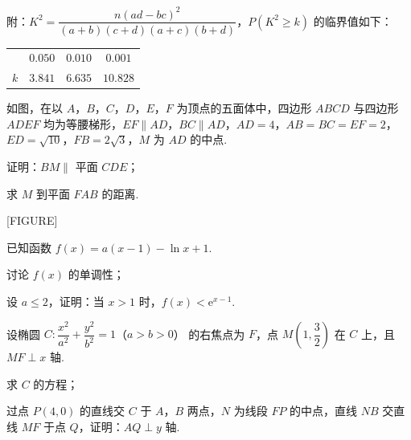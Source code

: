 \documentclass[UTF8,12pt]{ctexart}
\begin{document}
\begin{questions}[start=17]
    附：$K^2=\dfrac{n(ad-bc)^2}{(a+b)(c+d)(a+c)(b+d)}$，$P(K^2\ge k)$ 的临界值如下：

    \begin{center}
      \begin{tabular}{lccc}
        \toprule
            & $0.050$ & $0.010$ & $0.001$ \\
        $k$ & $3.841$ & $6.635$ & $10.828$ \\
        \bottomrule
      \end{tabular}
    \end{center}

  \item 如图，在以 $A$，$B$，$C$，$D$，$E$，$F$ 为顶点的五面体中，四边形 $ABCD$ 与四边形
    $ADEF$ 均为等腰梯形，$EF\parallel AD$，$BC\parallel AD$，$AD=4$，$AB=BC=EF=2$，%
    $ED=\sqrt{10}$，$FB=2\sqrt3$，$M$ 为 $AD$ 的中点.

    \begin{subquestions}
      \item
      证明：$BM\parallel$ 平面 $CDE$；
      \item
      求 $M$ 到平面 $FAB$ 的距离.

      [FIGURE]
    \end{subquestions}

  \item 已知函数 $f(x)=a(x-1)-\ln x+1$.

    \begin{subquestions}
      \item
      讨论 $f(x)$ 的单调性；
      \item
      设 $a\le2$，证明：当 $x>1$ 时，$f(x)<\mathrm{e}^{x-1}$.
    \end{subquestions}

  \item 设椭圆 $C:\dfrac{x^2}{a^2}+\dfrac{y^2}{b^2}=1$（$a>b>0$） 的右焦点为 $F$，点
    $M\left(1,\dfrac32\right)$ 在 $C$ 上，且 $MF\perp x$ 轴.

    \begin{subquestions}
      \item
      求 $C$ 的方程；
      \item
      过点 $P(4,0)$ 的直线交 $C$ 于 $A$，$B$ 两点，$N$ 为线段 $FP$ 的中点，直线 $NB$
        交直线 $MF$ 于点 $Q$，证明：$AQ\perp y$ 轴.
    \end{subquestions}

\end{questions}
\end{document}
